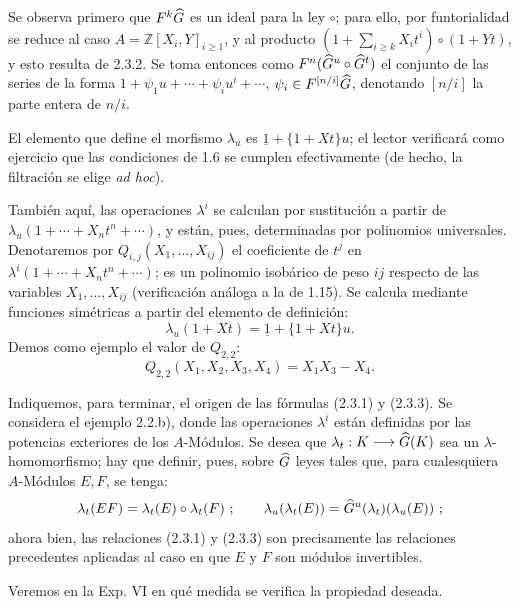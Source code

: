 Se observa primero que \(F^k\widehat G\) es un ideal para la ley \(\circ\); para ello, por funtorialidad se reduce al caso \(A=\mathbb Z[X_i,Y]_{i\geq1}\), y al producto \(\left(1+\sum_{i\geq k}X_i t^i\right)\circ(1+Yt)\), y esto resulta de 2.3.2. Se toma entonces como \(F^n(\widehat G^u\circ\widehat G^t)\) el conjunto de las series de la forma \(1+\psi_1u+\cdots+\psi_i u^i+\cdots\), \(\psi_i\in F^{[n/i]}\widehat G\), denotando \([n/i]\) la parte entera de \(n/i\).

El elemento que define el morfismo \(\lambda_u\) es \(\underline 1+\{1+Xt\}u\); el lector verificará como ejercicio que las condiciones de 1.6 se cumplen efectivamente (de hecho, la filtración se elige \emph{ad hoc}).

También aquí, las operaciones \(\lambda^i\) se calculan por sustitución a partir de \(\lambda_u(1+\cdots+X_nt^n+\cdots)\), y están, pues, determinadas por polinomios universales. Denotaremos por \(Q_{i,j}(X_1,\ldots,X_{ij})\) el coeficiente de \(t^j\) en \(\lambda^i(1+\cdots+X_nt^n+\cdots)\); es un polinomio isobárico de peso \(ij\) respecto de las variables \(X_1,\ldots,X_{ij}\) (verificación análoga a la de 1.15). Se calcula mediante funciones simétricas a partir del elemento de definición:
\begin{equation}\tag{2.3.3}
  \lambda_u(1+Xt)=\underline 1+\{1+Xt\}u.
\end{equation}
Demos como ejemplo el valor de \(Q_{2,2}\):
\[
  Q_{2,2}(X_1,X_2,X_3,X_4)=X_1X_3-X_4.
\]

Indiquemos, para terminar, el origen de las fórmulas (2.3.1) y (2.3.3). Se considera el ejemplo 2.2.b), donde las operaciones \(\lambda^i\) están definidas por las potencias exteriores de los \(A\)-Módulos. Se desea que \(\lambda_t:K\longrightarrow\widehat G(K)\) sea un \(\lambda\)-homomorfismo; hay que definir, pues, sobre \(\widehat G\) leyes tales que, para cualesquiera \(A\)-Módulos \(E,F\), se tenga:
\[
  \lambda_t(EF)=\lambda_t(E)\circ\lambda_t(F)~;\qquad
  \lambda_u(\lambda_t(E))=\widehat G^u(\lambda_t)(\lambda_u(E))~;
\]
ahora bien, las relaciones (2.3.1) y (2.3.3) son precisamente las relaciones precedentes aplicadas al caso en que \(E\) y \(F\) son módulos invertibles.

Veremos en la Exp. VI en qué medida se verifica la propiedad deseada.

